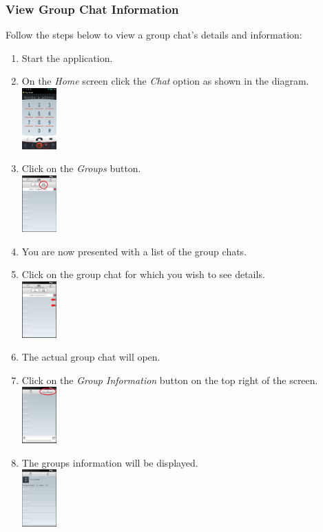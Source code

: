 \documentclass[11pt]{article}
\begin{document}
\subsubsection{View Group Chat Information}  \label{info}
Follow the steps below to view a group chat's details and information:
\begin{enumerate}
\item Start the application.
\item On the \textit{Home} screen click the \textit{Chat} option as shown in the diagram.\\
\includegraphics[width=50px]{images/mainScreen.png}
\item Click on the \textit{Groups} button.\\
\includegraphics[width=50px]{images/ChatlistNav.png}
\item You are now presented with a list of the group chats.
\item Click on the group chat for which you wish to see details.\\
\includegraphics[width=50px]{images/Grouplist.png}
\item The actual group chat will open.
\item Click on the \textit{Group Information} button on the top right of the screen.\\
\includegraphics[width=50px]{images/groupchatInfo.png}
\item The groups information will be displayed.\\
\includegraphics[width=50px]{images/groupchatInfoDisp.png}
\end{enumerate}
\end{document}
